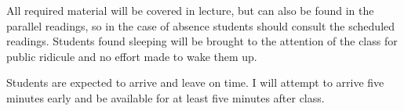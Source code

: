 \documentclass{syllabus}
\begin{document}
All required material will be covered in lecture, but can also be found in the parallel readings, so in the case of absence students should consult the scheduled readings. Students found sleeping will be brought to the attention of the class for public ridicule and no effort made to wake them up.

Students are expected to arrive and leave on time. I will attempt to arrive five minutes early and be available for at least five minutes after class.

\collegepolicies
\end{document}
